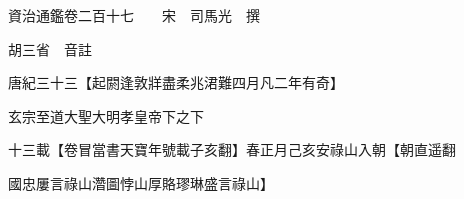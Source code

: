 










 


 
 


 

  
  
  
  
  





  
  
  
  
  
 
  

  

  
  
  



  

 
 

  
   




  

  
  


  　　資治通鑑卷二百十七　　宋　司馬光　撰

　　胡三省　音註

　　唐紀三十三【起閼逢敦牂盡柔兆涒難四月凡二年有奇】

　　玄宗至道大聖大明孝皇帝下之下

　　十三載【卷冒當書天寶年號載子亥翻】春正月己亥安祿山入朝【朝直遥翻

　　國忠屢言祿山濳圖悖山厚賂璆琳盛言祿山】


